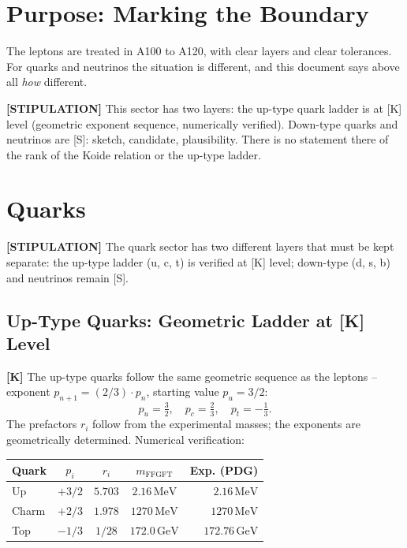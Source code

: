\section{Purpose: Marking the Boundary}

The leptons are treated in A100 to A120, with clear layers and clear tolerances.
For quarks and neutrinos the situation is different, and this document says above
all \emph{how} different.

\textbf{[STIPULATION]} This sector has two layers: the up-type quark ladder is at
[K] level (geometric exponent sequence, numerically verified). Down-type quarks
and neutrinos are [S]: sketch, candidate, plausibility. There is no statement
there of the rank of the Koide relation or the up-type ladder.

\section{Quarks}

\textbf{[STIPULATION]} The quark sector has two different layers that must be kept
separate: the up-type ladder (u, c, t) is verified at [K] level; down-type (d, s, b)
and neutrinos remain [S].

\subsection{Up-Type Quarks: Geometric Ladder at [K] Level}

\textbf{[K]} The up-type quarks follow the same geometric sequence as the leptons
-- exponent $p_{n+1}=(2/3)\cdot p_n$, starting value $p_u=3/2$:
\[
  p_u = \tfrac32,\quad p_c = \tfrac23,\quad p_t = -\tfrac13.
\]
The prefactors $r_i$ follow from the experimental masses; the exponents are
geometrically determined. Numerical verification:

\begin{center}
\renewcommand{\arraystretch}{1.3}
{\small\begin{tabular}{lcccr}
\toprule
Quark & $p_i$ & $r_i$ & $m_\text{FFGFT}$ & Exp. (PDG) \\
\midrule
Up    & $+3/2$ & $5{.}703$ & $2{.}16\,\text{MeV}$    & $2{.}16\,\text{MeV}$ \\
Charm & $+2/3$ & $1{.}978$ & $1270\,\text{MeV}$      & $1270\,\text{MeV}$ \\
Top   & $-1/3$ & $1/28$    & $172{.}0\,\text{GeV}$   & $172{.}76\,\text{GeV}$ \\
\bottomrule
\end{tabular}}
\renewcommand{\arraystretch}{1.0}
\end{center}

